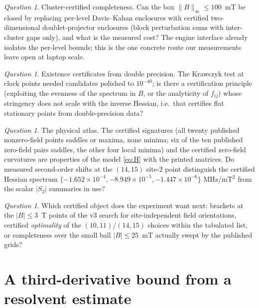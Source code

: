\documentclass[11pt]{amsart}
\theoremstyle{plain}
\theoremstyle{definition}
\theoremstyle{remark}
\newtheorem{question}[theorem]{Question}
\begin{document}
\begin{question}
Cluster-certified completeness.  Can the box $\|B\|_\infty\le100$~mT be closed
by replacing per-level Davis--Kahan enclosures with certified two-dimensional
doublet-projector enclosures (block perturbation sums with inter-cluster gaps
only), and what is the measured cost?  The engine interface already isolates
the per-level bounds; this is the one concrete route our measurements leave
open at laptop scale.
\end{question}

\begin{question}
Existence certificates from double precision.  The Krawczyk test at clock
points needed candidates polished to $10^{-40}$; is there a certification
principle (exploiting the evenness of the spectrum in $B$, or the analyticity
of $f_{ij}$) whose stringency does not scale with the inverse Hessian, i.e.\
that certifies flat stationary points from double-precision data?
\end{question}

\begin{question}
The physical atlas.  The certified signatures (all twenty published
nonzero-field points saddles or maxima, none minima; six of the ten published
zero-field pairs saddles, the other four local minima) and the certified
zero-field curvatures are properties of the model \eqref{eq:H} with the
printed matrices.  Do measured second-order
shifts at the $(14,15)$ site-2 point distinguish the certified Hessian
spectrum $\{-1.652\times10^{-4},-8.949\times10^{-5},-1.447\times10^{-6}\}$
MHz/mT$^2$ from the scalar $\lvert S_2\rvert$ summaries in use?
\end{question}

\begin{question}
Which certified object does the experiment want next: brackets at the
$\lvert B\rvert\le3$~T points of the v3 search for site-independent field
orientations, certified \emph{optimality} of the $(10,11)$/$(14,15)$ choices
within the tabulated list, or completeness over the small ball
$\lvert B\rvert\le25$~mT actually swept by the published grids?
\end{question}

\appendix

\section{A third-derivative bound from a resolvent estimate}\label{app:third}
\end{document}
